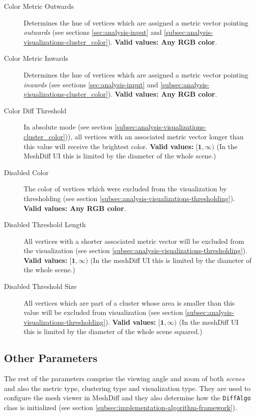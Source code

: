 \begin{description}
\item [Color Metric Outwards] Determines the hue of vertices which are assigned a metric vector pointing {\it outwards} (see sections \ref{sec:analysis-input} and \ref{subsec:analysis-visualizations-cluster_color}). {\bf Valid values: Any RGB color}.

\item [Color Metric Inwards] Determines the hue of vertices which are assigned a metric vector pointing {\it inwards} (see sections \ref{sec:analysis-input} and \ref{subsec:analysis-visualizations-cluster_color}). {\bf Valid values: Any RGB color}.

\item [Color Diff Threshold] In absolute mode (see section \ref{subsec:analysis-visualizations-cluster_color})), all vertices with an associated metric vector longer than this value will receive the brightest color. {\bf Valid values:} \(\bm{[1, \infty)}\) (In the MeshDiff UI this is limited by the diameter of the whole scene.)

\item [Disabled Color] The color of vertices which were excluded from the visualization by thresholding (see section \ref{subsec:analysis-visualizations-thresholding}). {\bf Valid values: Any RGB color}.

\item [Disabled Threshold Length] All vertices with a shorter associated metric vector will be excluded from the visualization (see section \ref{subsec:analysis-visualizations-thresholding}). {\bf Valid values:} \(\bm{[1, \infty)}\) (In the meshDiff UI this is limited by the diameter of the whole scene.)

\item [Disabled Threshold Size] All vertices which are part of a cluster whose area is smaller than this value will be excluded from visualization (see section \ref{subsec:analysis-visualizations-thresholding}). {\bf Valid values:} \(\bm{[1, \infty)}\) (In the meshDiff UI this is limited by the diameter of the whole scene squared.)
\end{description}

\subsection{Other Parameters}
\label{attch:parameter_desc-other_parameters}

The rest of the parameters comprise the viewing angle and zoom of both {\it scenes} and also the metric type, clustering type and visualization type. They are used to configure the mesh viewer in MeshDiff and they also determine how the \verb+DiffAlgo+ class is initialized (see section \ref{subsec:implementation-algorithm-framework}).

